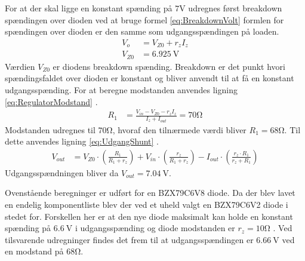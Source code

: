 For at der skal ligge en konstant spænding på $7 \si{\volt}$ udregnes først breakdown spændingen over dioden ved at bruge formel \ref{eq:BreakdownVolt} \cite[Side. 146]{Sedra19uu} formlen for spændingen over dioden er den samme som udgangsspændingen på loaden. 
\begin{align}
	V_o & = V_{Z0} + r_z I_z \label{eq:BreakdownVolt} \\
	V_{Z0} & = \SI{6.925}{\volt}
	\end{align}
Værdien $V_{Z0}$ er diodens breakdown spænding.
Breakdown er det punkt hvori spændingsfaldet over dioden er konstant og bliver anvendt til at få en konstant udgangsspænding.
For at beregne modstanden anvendes ligning \ref{eq:RegulatorModstand} \cite[Side. 149]{Sedra19uu}.
\begin{align}
	R_1 & = \frac{V_{in}-V_{Z0}-r_z I_z}{I_z+I_{out}} = 70\si{\ohm} \label{eq:RegulatorModstand}
\end{align}
Modstanden udregnes til $70 \si{\ohm}$, hvoraf den tilnærmede værdi bliver $R_1 = 68 \si{\ohm}$.
Til dette anvendes ligning \ref{eq:UdgangShunt} \cite[Side. 149]{Sedra19uu}.
\begin{align}
	V_{out} & = V_{Z0} \cdot \left( \frac{R_1}{R_1+r_z} \right) + V_{in} \cdot \left( \frac{r_z}{R_1+r_z} \right) - I_{out} \cdot \left( \frac{r_z \cdot R_1}{r_z+R_1} \right) \label{eq:UdgangShunt}
\end{align}
Udgangsspændningen bliver da $V_{out} = \SI{7.04}{\volt}$.

Ovenstående beregninger er udført for en BZX79C6V8 diode. 
Da der blev lavet en endelig komponentliste blev der ved et uheld valgt en BZX79C6V2 diode i stedet for. 
Forskellen her er at den nye diode maksimalt kan holde en konstant spænding på $\SI{6.6}{\volt}$ i udgangsspænding og diode modstanden er $r_z = 10 \si{\ohm}$ \cite[Side. 1 Kolonne 11]{ZenerDiode}.
Ved tilsvarende udregninger findes det frem til at udgangsspændingen er $\SI{6.66}{\volt}$ ved en modstand på $68 \si{\ohm}$.
